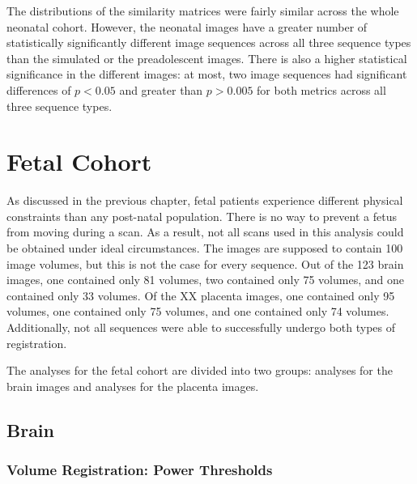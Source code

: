The distributions of the similarity matrices were fairly similar across the whole neonatal cohort. However, the neonatal images have a greater number of statistically significantly different image sequences across all three sequence types than the simulated or the preadolescent images. There is also a higher statistical significance in the different images: at most, two image sequences had significant differences of $p < 0.05$ and greater than $p > 0.005$ for both metrics across all three sequence types.

\section{Fetal Cohort}

As discussed in the previous chapter, fetal patients experience different physical constraints than any post-natal population. There is no way to prevent a fetus from moving during a scan. As a result, not all scans used in this analysis could be obtained under ideal circumstances. The images are supposed to contain 100 image volumes, but this is not the case for every sequence. Out of the 123 brain images, one contained only 81 volumes, two contained only 75 volumes, and one contained only 33 volumes. Of the XX placenta images, one contained only 95 volumes, one contained only 75 volumes, and one contained only 74 volumes. Additionally, not all sequences were able to successfully undergo both types of registration. 

The analyses for the fetal cohort are divided into two groups: analyses for the brain images and analyses for the placenta images. 

\subsection{Brain}

\subsubsection{Volume Registration: Power Thresholds}

